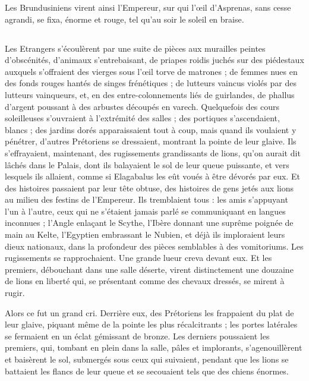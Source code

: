\documentclass[a4paper, 11pt, oneside, polutonikogreek, french]{article}
\begin{document}
Les Brundusiniens virent ainsi l'Empereur, sur qui l'œil d'Asprenas, sans cesse agrandi, se fixa, énorme et rouge, tel qu'au soir le soleil en braise.
\clearpage
\subsection{}
\paragraph{}
Les Etrangers s'écoulèrent par une suite de pièces aux murailles peintes d'obscénités, d'animaux s'entrebaisant, de priapes roidis juchés sur des piédestaux auxquels s'offraient des vierges sous l'œil torve de matrones ; de femmes nues en des fonds rouges hantés de singes frénétiques ; de lutteurs vaincus violés par des lutteurs vainqueurs, et, en des entre-colonnements liés de guirlandes, de phallus d'argent poussant à des arbustes découpés en varech. Quelquefois des cours soleilleuses s'ouvraient à l'extrémité des salles ; des portiques s'ascendaient, blancs ; des jardins dorés apparaissaient tout à coup, mais quand ils voulaient y pénétrer, d'autres Prétoriens se dressaient, montrant la pointe de leur glaive. Ils s'effrayaient, maintenant, des rugissements grandissants de lions, qu'on aurait dit lâchés dans le Palais, dont ils balayaient le sol de leur queue puissante, et vers lesquels ils allaient, comme si Elagabalus les eût voués à être dévorés par eux. Et des histoires passaient par leur tête obtuse, des histoires de gens jetés aux lions au milieu des festins de l'Empereur. Ils tremblaient tous : les amis s'appuyant l'un à l'autre, ceux qui ne s'étaient jamais parlé se communiquant en langues inconnues ; l'Angle enlaçant le Scythe, l'Ibère donnant une suprême poignée de main au Kelte, l'Egyptien embrassant le Nubien, et déjà ils imploraient leurs dieux nationaux, dans la profondeur des pièces semblables à des vomitoriums. Les rugissements se rapprochaient. Une grande lueur creva devant eux. Et les premiers, débouchant dans une salle déserte, virent distinctement une douzaine de lions en liberté qui, se présentant comme des chevaux dressés, se mirent à rugir.

Alors ce fut un grand cri. Derrière eux, des Prétoriens les frappaient du plat de leur glaive, piquant même de la pointe les plus récalcitrants ; les portes latérales se fermaient en un éclat gémissant de bronze. Les derniers poussaient les premiers, qui, tombant en plein dans la salle, pâles et implorants, s'agenouillèrent et baisèrent le sol, submergés sous ceux qui suivaient, pendant que les lions se battaient les flancs de leur queue et se secouaient tels que des chiens énormes.
\end{document}
